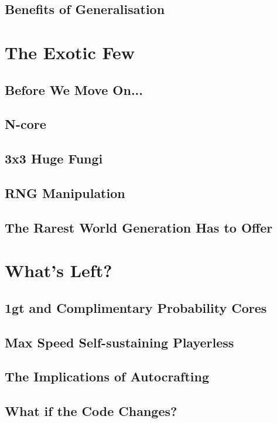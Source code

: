 \documentclass[11pt,a4paper]{article}
\begin{document}
    \subsection{Benefits of Generalisation}
    \lipsum[16]

\section{The Exotic Few}
    \subsection{Before We Move On...} %
    \lipsum[17]
    \subsection{N-core}
    \lipsum[18]
    \subsection{3x3 Huge Fungi}
    \lipsum[18]
    \subsection{RNG Manipulation}
    \lipsum[18]
    \subsection{The Rarest World Generation Has to Offer}
    \lipsum[18]

\section{What's Left?}
    \subsection{1gt and Complimentary Probability Cores}
    \lipsum[19]
    \subsection{Max Speed Self-sustaining Playerless}
    \lipsum[20]
    \subsection{The Implications of Autocrafting}
    \lipsum[20]
    \subsection{What if the Code Changes?}
    \lipsum[20]
\end{document}
